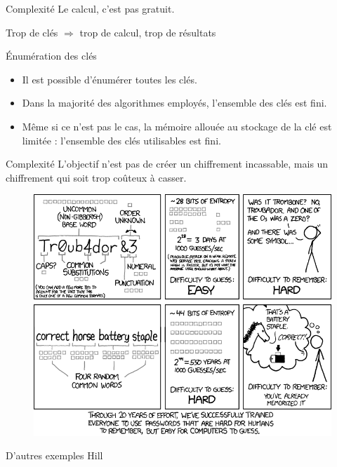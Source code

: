 \documentclass{beamer}
\begin{document}
\begin{frame}{Complexité}
  Le calcul, c'est pas gratuit.

  Trop de clés $\Rightarrow$ trop de calcul, trop de résultats


\begin{frame}{Énumération des clés}
  \begin{itemize}
  
  \item Il est possible d'énumérer toutes les clés.
  
  \item Dans la majorité des algorithmes employés, l'ensemble des clés est fini.
  
  \item Même si ce n'est pas le cas, la mémoire allouée au stockage de la clé est limitée : l'ensemble des clés utilisables est fini.
  
  \end{itemize}
  \end{frame}

\begin{frame}{Complexité}
  L'objectif n'est pas de créer un chiffrement incassable, mais un chiffrement qui soit trop coûteux à casser.

  
  \begin{figure}
  \centering
  \includegraphics[scale = 0.35]{xkcdpassword_strength.png}
  \end{figure}
  \end{frame}

\begin{frame}{D'autres exemples}
  Hill


\end{frame}
\end{frame}
\end{document}
